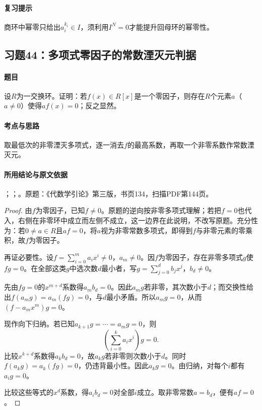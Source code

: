 \paragraph{复习提示}

商环中幂零只给出$a_i^{k_i}\in I$，须利用$I^N=0$才能提升回母环的幂零性。



\subsection{习题44：多项式零因子的常数湮灭元判据}

\label{ex:3:44}

\paragraph{题目}

设$R$为一交换环。证明：若$f(x)\in R[x]$是一个零因子，则存在$R$个元素$a$（$a\ne0$）使得$af(x)=0$；反之显然。

\paragraph{考点与思路}

取最低次的非零湮灭多项式，逐一消去$f$的最高系数，再取一个非零系数作常数湮灭元。

\paragraph{所用结论与原文依据}

；；。原题：《代数学引论》第三版，书页134，扫描PDF第144页。


\begin{proof}

由$f$为零因子，已知$f\ne0$。原题的逆向按非零多项式理解；若把$f=0$也代入，右侧在非零环中成立而左侧不成立，这一边界在此说明，不改写原题。充分性为：若$0\ne a\in R$且$af=0$，将$a$视为非零常数多项式，即得到$f$与非零元素的零乘积，故$f$为零因子。

再证必要性。设$f=\sum_{i=0}^m a_ix^i\ne0$，$a_m\ne0$。因$f$为零因子，存在非零多项式$g$使$fg=0$。在全部这类$g$中选次数$d$最小者，写$g=\sum_{j=0}^d b_jx^j$，$b_d\ne0$。

先由$fg=0$的$x^{m+d}$系数得$a_mb_d=0$。因此$a_mg$若非零，其次数小于$d$；而交换性给出$f(a_mg)=a_m(fg)=0$，与$d$最小矛盾。所以$a_mg=0$，从而$(f-a_mx^m)g=0$。

现作向下归纳。若已知$a_{k+1}g=\cdots=a_mg=0$，则
\[
\left(\sum_{i=0}^k a_ix^i\right)g=0.
\]
比较$x^{k+d}$系数得$a_kb_d=0$，故$a_kg$若非零则次数小于$d$。同时$f(a_kg)=a_k(fg)=0$，仍违背最小性。因此$a_kg=0$。由归纳，对每个$i$都有$a_ig=0$。

比较这些等式的$x^d$系数，得$a_ib_d=0$对全部$i$成立。取非零常数$a=b_d$，便有$af=0$。

\end{proof}

